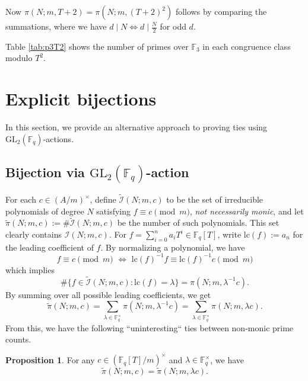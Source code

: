 \documentclass[10pt,reqno]{amsproc}
\newcommand{\GL}{\mathrm{GL}}
\newcommand{\lc}{\mathrm{lc}}
\newcommand{\bF}{\mathbb{F}}
\newcommand{\cI}{\mathcal{I}}
\newcommand{\1}{\mathds{1}}	%
\theoremstyle{definition}
\newtheorem{proposition}[theorem]{Proposition}
\theoremstyle{remark}
\begin{document}
Now $\pi(N; m, T+2) = \pi(N; m, (T+2)^2)$ follows by comparing the summations, where we have $d \mid N \Leftrightarrow d \mid \frac{N}{2}$ for odd $d$.

Table \ref{tab:p3T2} shows the number of primes over $\bF_3$ in each congruence class modulo $T^2$.

\section{Explicit bijections}
\label{sec:bijection}

In this section, we provide an alternative approach to proving ties using \(\GL_2(\bF_q)\)-actions.

\subsection{Bijection via $\GL_2(\bF_q)$-action}

For each $c \in (A /m)^\times$, define $\widetilde{\cI}(N; m, c)$ to be the set of irreducible polynomials of degree $N$ satisfying $f \equiv c \pmod{m}$, \emph{not necessarily monic}, and let $\widetilde{\pi}(N; m, c) := \# \widetilde{\cI}(N; m, c)$ be the number of such polynomials.
This set clearly contains $\cI(N; m, c)$.
For $f = \sum_{i=0}^{n} a_i T^i \in \bF_q[T]$, write $\lc(f) := a_n$ for the leading coefficient of $f$.
By normalizing a polynomial, we have
\begin{equation}
    \label{eqn:congnorm}
    f \equiv c \pmod{m} \,\,\Leftrightarrow\,\, \lc(f)^{-1} f \equiv \lc(f)^{-1} c \pmod{m}
\end{equation}
which implies
\[
\#\{f \in \widetilde{\cI}(N; m, c) : \lc(f) = \lambda\} = \pi(N; m, \lambda^{-1} c).
\]
By summing over all possible leading coefficients, we get
\begin{equation}
    \label{eqn:Itildesum}
    \widetilde{\pi}(N; m, c) = \sum_{\lambda \in \bF_q^\times} \pi(N; m, \lambda^{-1} c) = \sum_{\lambda \in \bF_q^\times} \pi(N; m, \lambda c).
\end{equation}
From this, we have the following ``uninteresting`` ties between non-monic prime counts.
\begin{proposition}
    \label{eqn:tie_nonmonic_const}
    For any $c \in (\bF_q[T] / m)^\times$ and $\lambda \in \bF_q^\times$, we have
    \begin{equation}
        \widetilde{\pi}(N; m, c) = \widetilde{\pi}(N; m, \lambda c).
    \end{equation}
\end{proposition}
\end{document}
